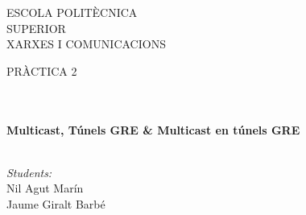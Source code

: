 \documentclass[10pt]{article}
\begin{document}
\begin{center}
\begin{minipage}{0.48\textwidth}
\begin{flushright}
\end{flushright}\end{minipage}

\vspace*{-1.5cm}                                %
\textsc{\huge ESCOLA POLIT\` ECNICA \\ \vspace{5px}SUPERIOR}\\[1.5cm] 

\textsc{\LARGE XARXES I COMUNICACIONS}\\[1.5cm]                                                   %

\begin{minipage}{0.9\textwidth} 
\begin{center}                                                                                  %
\textsc{\LARGE PR\`ACTICA 2}
\end{center}
\end{minipage}\\[0.5cm]
            \vspace*{1cm}                                                                       %
\HRule \\[0.4cm]                                                                    %
{ \huge \bfseries Multicast, Túnels GRE \& Multicast en túnels GRE}\\[0.4cm]  %
\HRule \\[1.5cm]                                                                    %
\begin{minipage}{0.46\textwidth}                                                    %
\begin{flushleft} \large                                                            %
\emph{Students:}\\   
Nil Agut Marín\\
Jaume Giralt Barbé

\end{flushleft}
\end{minipage}
\end{center}
\end{document}
